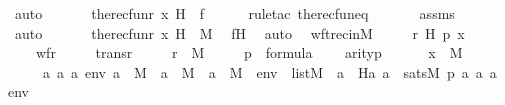 \begin{isabellebody}
\ auto\ \isanewline
\ \ \isamarkupfalse%
\ \isamarkupfalse%
\ {\isachardoublequoteopen}the{\isacharunderscore}{\kern0pt}recfun{\isacharparenleft}{\kern0pt}r{\isacharcomma}{\kern0pt}\ x{\isacharcomma}{\kern0pt}\ H{\isacharparenright}{\kern0pt}\ {\isacharequal}{\kern0pt}\ f{\isachardoublequoteclose}\ \isanewline
\ \ \ \ \isamarkupfalse%
{\isacharparenleft}{\kern0pt}rule{\isacharunderscore}{\kern0pt}tac\ the{\isacharunderscore}{\kern0pt}recfun{\isacharunderscore}{\kern0pt}eq{\isacharparenright}{\kern0pt}\ \isanewline
\ \ \ \ \isamarkupfalse%
\ assms\ \isanewline
\ \ \ \ \isamarkupfalse%
\ auto\ \isanewline
\ \ \isamarkupfalse%
\ \isamarkupfalse%
\ {\isachardoublequoteopen}the{\isacharunderscore}{\kern0pt}recfun{\isacharparenleft}{\kern0pt}r{\isacharcomma}{\kern0pt}\ x{\isacharcomma}{\kern0pt}\ H{\isacharparenright}{\kern0pt}\ {\isasymin}\ M{\isachardoublequoteclose}\ \isamarkupfalse%
\ fH\ \isamarkupfalse%
\ auto\ \isanewline
{}\isamarkupfalse%
%
\endisatagproof
{\isafoldproof}%
%
\isadelimproof
\isanewline
%
\endisadelimproof
\isanewline
{}\isamarkupfalse%
\ wftrec{\isacharunderscore}{\kern0pt}in{\isacharunderscore}{\kern0pt}M\ {\isacharcolon}{\kern0pt}\ \isanewline
\ \ \ r\ H\ p\ x\ \isanewline
\ \ \ \isanewline
\ \ \ \ {\isachardoublequoteopen}wf{\isacharparenleft}{\kern0pt}r{\isacharparenright}{\kern0pt}{\isachardoublequoteclose}\ \isanewline
\ \ \ \ {\isachardoublequoteopen}trans{\isacharparenleft}{\kern0pt}r{\isacharparenright}{\kern0pt}{\isachardoublequoteclose}\ \isanewline
\ \ \ \ {\isachardoublequoteopen}r\ {\isasymin}\ M{\isachardoublequoteclose}\ \isanewline
\ \ \ \ {\isachardoublequoteopen}p\ {\isasymin}\ formula{\isachardoublequoteclose}\isanewline
\ \ \ \ {\isachardoublequoteopen}arity{\isacharparenleft}{\kern0pt}p{\isacharparenright}{\kern0pt}\ {\isasymle}\ {}{\isachardoublequoteclose}\isanewline
\ \ \ \ {\isachardoublequoteopen}x\ {\isasymin}\ M{\isachardoublequoteclose}\ \isanewline
\ \ \ \ {\isachardoublequoteopen}\ {\isacharparenleft}{\kern0pt}{\isasymAnd}a{}\ a{}\ a{}\ env{\isachardot}{\kern0pt}\ a{}\ {\isasymin}\ M\ {\isasymLongrightarrow}\ a{}\ {\isasymin}\ M\ {\isasymLongrightarrow}\ a{}\ {\isasymin}\ M\ {\isasymLongrightarrow}\ env\ {\isasymin}\ list{\isacharparenleft}{\kern0pt}M{\isacharparenright}{\kern0pt}\ {\isasymLongrightarrow}\ a{}\ {\isacharequal}{\kern0pt}\ H{\isacharparenleft}{\kern0pt}a{}{\isacharcomma}{\kern0pt}\ a{}{\isacharparenright}{\kern0pt}\ {\isasymlongleftrightarrow}\ sats{\isacharparenleft}{\kern0pt}M{\isacharcomma}{\kern0pt}\ p{\isacharcomma}{\kern0pt}\ {\isacharbrackleft}{\kern0pt}a{}{\isacharcomma}{\kern0pt}\ a{}{\isacharcomma}{\kern0pt}\ a{}{\isacharbrackright}{\kern0pt}\ {\isacharat}{\kern0pt}\ env{\isacharparenright}{\kern0pt}{\isacharparenright}{\kern0pt}{\isachardoublequoteclose}\ \ \isanewline

\end{isabellebody}
